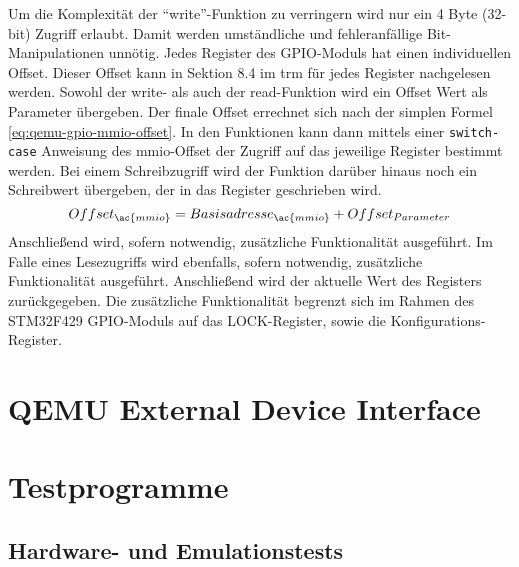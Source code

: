 Um die Komplexität der \enquote{write}-Funktion zu verringern wird nur
ein 4 Byte (32-bit) Zugriff erlaubt.
Damit werden umständliche und fehleranfällige Bit-Manipulationen unnötig.
Jedes Register des GPIO-Moduls hat einen individuellen Offset.
Dieser Offset kann in Sektion 8.4 im \ac{trm} für jedes Register nachgelesen
werden\cite{Stm32F4Trm}.
Sowohl der write- als auch der read-Funktion wird ein Offset Wert als Parameter
übergeben.
Der finale Offset errechnet sich nach der simplen Formel
\ref{eq:qemu-gpio-mmio-offset}.
In den Funktionen kann dann mittels einer \texttt{switch-case} Anweisung des
\ac{mmio}-Offset der Zugriff auf das jeweilige Register bestimmt werden.
Bei einem Schreibzugriff wird der Funktion darüber hinaus noch ein Schreibwert
übergeben, der in das Register geschrieben wird.
\begin{equation}
    Offset_{\ac{mmio}} = Basisadresse_{\ac{mmio}} + Offset_{Parameter}
    \label{eq:qemu-gpio-mmio-offset}
\end{equation}
Anschließend wird, sofern notwendig, zusätzliche Funktionalität ausgeführt.
Im Falle eines Lesezugriffs wird ebenfalls, sofern notwendig, zusätzliche
Funktionalität ausgeführt.
Anschließend wird  der aktuelle Wert des Registers zurückgegeben.
Die zusätzliche Funktionalität begrenzt sich im Rahmen des STM32F429
GPIO-Moduls auf das LOCK-Register, sowie die Konfigurations-Register.

\section{QEMU External Device Interface}

\section{Testprogramme}

\subsection{Hardware- und Emulationstests}
